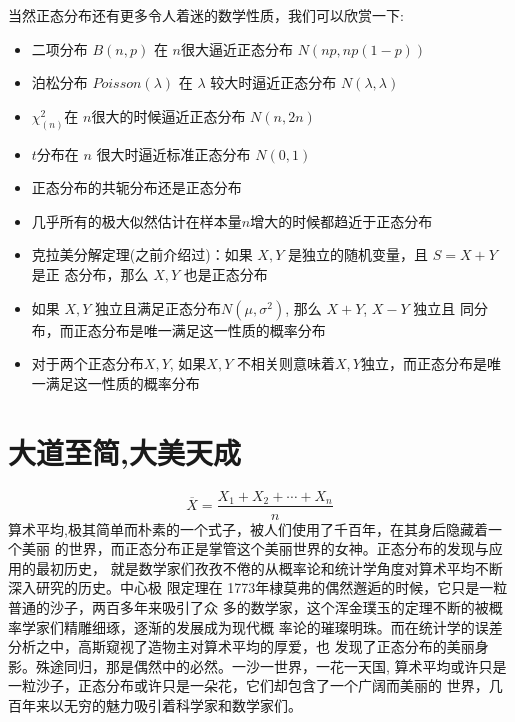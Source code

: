 当然正态分布还有更多令人着迷的数学性质，我们可以欣赏一下:
\begin{itemize}
\item 二项分布 $B(n,p)$ 在 $n$很大逼近正态分布 $N(np, np(1-p))$
\item 泊松分布 $Poisson(\lambda)$ 在 $\lambda$ 较大时逼近正态分布 $N(\lambda,\lambda)$
\item $\chi^2_{(n)}$在 $n$很大的时候逼近正态分布 $N(n,2n)$
\item $t$分布在 $n$ 很大时逼近标准正态分布 $N(0,1)$
\item 正态分布的共轭分布还是正态分布
\item 几乎所有的极大似然估计在样本量$n$增大的时候都趋近于正态分布
\item 克拉美分解定理(之前介绍过)：如果 $X,Y$ 是独立的随机变量，且 $S=X+Y$ 是正
      态分布，那么 $X,Y$ 也是正态分布
\item 如果 $X,Y$ 独立且满足正态分布$N(\mu, \sigma^2)$, 那么 $X+Y$, $X-Y$ 独立且
      同分布，而正态分布是唯一满足这一性质的概率分布
\item 对于两个正态分布$X,Y$, 如果$X,Y$ 不相关则意味着$X,Y$独立，而正态分布是唯
      一满足这一性质的概率分布
\end{itemize}

\section{大道至简,大美天成}


$$\overline{X} = \frac{X_1 + X_2 + \cdots + X_n}{n} $$
算术平均,极其简单而朴素的一个式子，被人们使用了千百年，在其身后隐藏着一个美丽
的世界，而正态分布正是掌管这个美丽世界的女神。正态分布的发现与应用的最初历史，
就是数学家们孜孜不倦的从概率论和统计学角度对算术平均不断深入研究的历史。中心极
限定理在 1773年棣莫弗的偶然邂逅的时候，它只是一粒普通的沙子，两百多年来吸引了众
多的数学家，这个浑金璞玉的定理不断的被概率学家们精雕细琢，逐渐的发展成为现代概
率论的璀璨明珠。而在统计学的误差分析之中，高斯窥视了造物主对算术平均的厚爱，也
发现了正态分布的美丽身影。殊途同归，那是偶然中的必然。一沙一世界，一花一天国,
算术平均或许只是一粒沙子，正态分布或许只是一朵花，它们却包含了一个广阔而美丽的
世界，几百年来以无穷的魅力吸引着科学家和数学家们。


